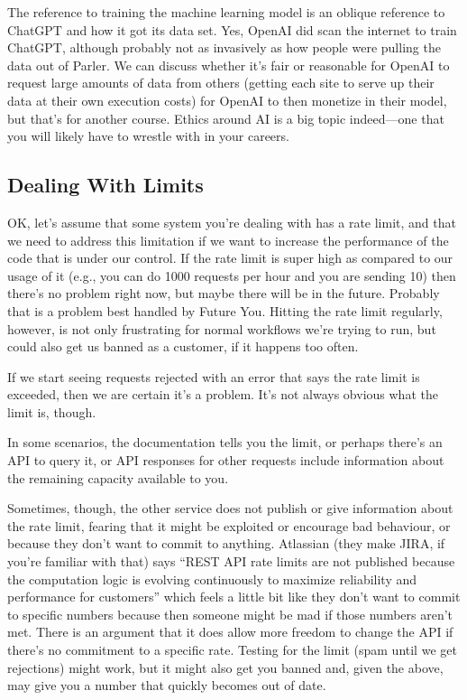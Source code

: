 The reference to training the machine learning model is an oblique reference to ChatGPT and how it got its data set. Yes, OpenAI did scan the internet to train ChatGPT, although probably not as invasively as how people were pulling the data out of Parler. We can discuss whether it's fair or reasonable for OpenAI to request large amounts of data from others (getting each site to serve up their data at their own execution costs) for OpenAI to then monetize in their model, but that's for another course. Ethics around AI is a big topic indeed---one that you will likely have to wrestle with in your careers.


\subsection*{Dealing With Limits}

OK, let's assume that some system you're dealing with has a rate limit, and that we need to address this limitation if we want to increase the performance of the code that is under our control. If the rate limit is super high as compared to our usage of it (e.g., you can do 1000 requests per hour and you are sending 10) then there's no problem right now, but maybe there will be in the future. Probably that is a problem best handled by Future You. Hitting the rate limit regularly, however, is not only frustrating for normal workflows we're trying to run, but could also get us banned as a customer, if it happens too often. 

If we start seeing requests rejected with an error that says the rate limit is exceeded, then we are certain it's a problem. It's not always obvious what the limit is, though.

In some scenarios, the documentation tells you the limit, or perhaps there's an API to query it, or API responses for other requests include information about the remaining capacity available to you. 

Sometimes, though, the other service does not publish or give information about the rate limit, fearing that it might be exploited or encourage bad behaviour, or because they don't want to commit to anything. Atlassian (they make JIRA, if you're familiar with that) says ``REST API rate limits are not published because the computation logic is evolving continuously to maximize reliability and performance for customers'' which feels a little bit like they don't want to commit to specific numbers because then someone might be mad if those numbers aren't met. There is an argument that it does allow more freedom to change the API if there's no commitment to a specific rate. Testing for the limit (spam until we get rejections) might work, but it might also get you banned and, given the above, may give you a number that quickly becomes out of date.


